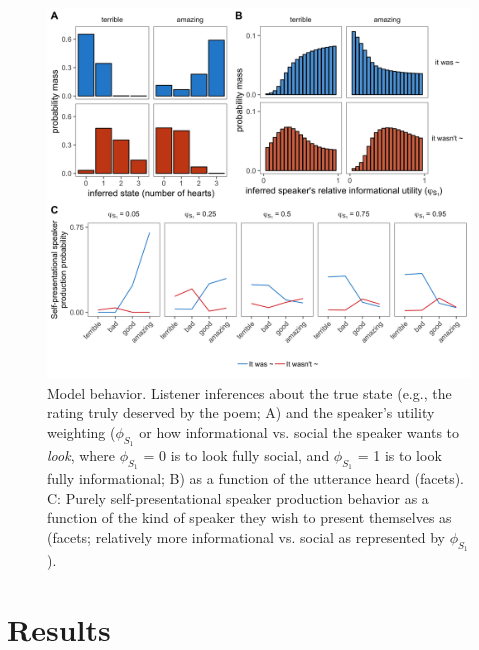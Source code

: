 \documentclass[9pt,twocolumn,twoside,lineno]{main_class_file}
\begin{document}
\begin{figure}[!h]
\includegraphics[width=\columnwidth]{fig/L1_inferences_wS2pres} \centering \caption{Model behavior. Listener inferences about the true state (e.g., the rating truly deserved by the poem; A) and the speaker's utility weighting ($\phi_{S_1}$ or how informational vs. social the speaker wants to \emph{look}, where $\phi_{S_1}$ = 0 is to look fully social, and $\phi_{S_1}$ = 1 is to look fully informational; B) as a function of the utterance heard (facets). C: Purely self-presentational speaker production behavior as a function of the kind of speaker they wish to present themselves as (facets; relatively more informational vs. social as represented by $\phi_{S_1}$).}\label{fig:L1inferences}
\end{figure}


\section*{Results}
\end{document}

